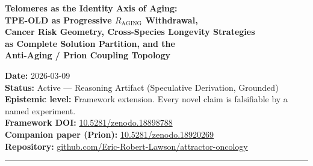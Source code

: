 \documentclass[12pt,a4paper]{article}
\newcommand{\tpeold}{TPE-OLD}
\begin{document}
\begin{titlepage}
\vspace*{2cm}
{\LARGE\bfseries Telomeres as the Identity Axis of Aging:\\[0.5em]
\large \tpeold{} as Progressive $R_{\mathrm{AGING}}$ Withdrawal,\\
Cancer Risk Geometry, Cross-Species Longevity Strategies\\
as Complete Solution Partition, and the\\
Anti-Aging / Prion Coupling Topology}

\vspace{1.5em}

\author[1]{Eric Robert Lawson}

\vspace{1.5em}

\noindent\textbf{Date:} 2026-03-09\\
\textbf{Status:} Active --- Reasoning Artifact (Speculative Derivation, Grounded)\\
\textbf{Epistemic level:} Framework extension. Every novel claim is falsifiable
by a named experiment.\\
\textbf{Framework DOI:}
\href{https://doi.org/10.5281/zenodo.18898788}{10.5281/zenodo.18898788}\\
\textbf{Companion paper (Prion):}
\href{https://doi.org/10.5281/zenodo.18920269}{10.5281/zenodo.18920269}\\
\textbf{Repository:}
\href{https://github.com/Eric-Robert-Lawson/attractor-oncology}{github.com/Eric-Robert-Lawson/attractor-oncology}

\vspace{1.5em}
\noindent\rule{\textwidth}{0.8pt}

\begin{abstract}
\noindent
The Identity Axis Framework defines biological identity maintenance through
$R = A/H$, where $A$ is the Identity Anchor and $H$ is the Convergence Hub.
We extend the framework to biological aging, establishing that telomere length
is a continuous coordinate in the framework rather than a separate mechanism:
it is the physical substrate of the Positional Identity Memory (PIN) signal
across decades of cell division.


\end{abstract}
\end{titlepage}
\end{document}
